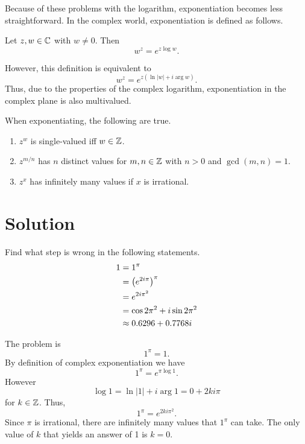 \documentclass[notitlepage]{problem-solving}
\begin{document}
Because of these problems with the logarithm, exponentiation becomes less straightforward.
In the complex world, exponentiation is defined as follows.
\begin{definition}
	Let $z,w\in\mathbb{C}$ with $w\neq 0$.
	Then
	\[
		w^z = e^{z\log w}.
	\]
\end{definition}
However, this definition is equivalent to
\[
	w^z = e^{z(\ln|w| + i\arg w)}.
\]
Thus, due to the properties of the complex logarithm, exponentiation in the complex plane is also multivalued.

When exponentiating, the following are true.
\begin{enumerate}
	\item $z^w$ is single-valued iff $w\in\mathbb{Z}$.
	\item $z^{m/n}$ has $n$ distinct values for $m,n\in\mathbb{Z}$ with $n>0$ and $\gcd(m,n)=1$.
	\item $z^x$ has infinitely many values if $x$ is irrational.
\end{enumerate}

\section{Solution}

\begin{problem*}
	Find what step is wrong in the following statements.
	\begin{align*}
		1 &= 1^\pi\\
		&= \left( e^{2i\pi} \right)^\pi\\
		&=e^{2i\pi^2}\\
		&=\cos 2\pi^2 + i\sin 2\pi^2\\
		&\approx 0.6296 +0.7768 i
	\end{align*}
\end{problem*}

The problem is
\[
	1^\pi = 1.
\]
By definition of complex exponentiation we have
\[
	1^\pi = e^{\pi\log 1}.
\]
However
\[
	\log 1 = \ln |1| + i\arg 1 = 0 + 2ki\pi
\]
for $k\in\mathbb{Z}$.
Thus,
\[
	1^{\pi} = e^{2ki\pi^2}.
\]
Since $\pi$ is irrational, there are infinitely many values that $1^\pi$ can take.
The only value of $k$ that yields an answer of 1 is $k=0$.

\printbibliography
\end{document}
